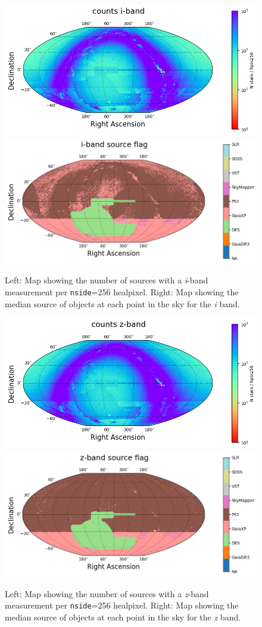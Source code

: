 \begin{figure}
    \includegraphics[width=0.48\linewidth]{./figures/source_density_maps/i-band_counts_full.png}
    \includegraphics[width=0.48\linewidth]{./figures/source_survey_maps/i-band_source.png}
    \caption{Left: Map showing the number of sources with a \textit{i}-band measurement per \texttt{nside}=256 healpixel.
    Right: Map showing the median source of objects at each point in the sky for the \textit{i} band.}
    \label{fig:monster-i}
\end{figure}
\begin{figure}  
    \includegraphics[width=0.48\linewidth]{./figures/source_density_maps/z-band_counts_full.png}
    \includegraphics[width=0.48\linewidth]{./figures/source_survey_maps/z-band_source.png}
    \caption{Left: Map showing the number of sources with a \textit{z}-band measurement per \texttt{nside}=256 healpixel.
    Right: Map showing the median source of objects at each point in the sky for the \textit{z} band.}
    \label{fig:monster-z}
\end{figure}
